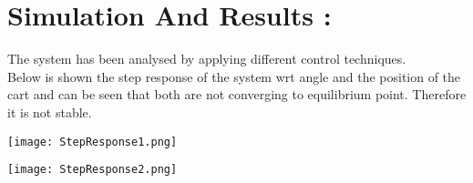 \documentclass[11pt]{article}
\begin{document}
\section{Simulation And Results : }
{The system has been analysed by applying different control techniques. \\
Below is shown the step response of the system wrt angle and the position of the cart and can be seen that both are not converging to equilibrium point. Therefore it is not stable. 
}
\begin{center}
\texttt{[image: StepResponse1.png]}
\end{center}
\begin{center}
\texttt{[image: StepResponse2.png]}
\end{center}
\end{document}
